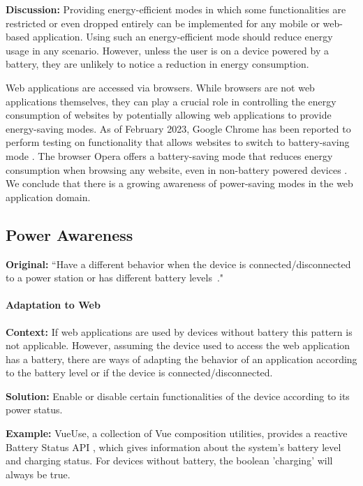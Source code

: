 \textbf{Discussion:} Providing energy-efficient modes in which some functionalities are restricted or even dropped entirely can be implemented for any mobile or web-based application. Using such an energy-efficient mode should reduce energy usage in any scenario. However, unless the user is on a device powered by a battery, they are unlikely to notice a reduction in energy consumption. 

Web applications are accessed via browsers. While browsers are not web applications themselves, they can play a crucial role in controlling the energy consumption of websites by potentially allowing web applications to provide energy-saving modes. As of February 2023, Google Chrome has been reported to perform testing on functionality that allows websites to switch to battery-saving mode \cite{chrome_battery_saving_mode} \cite{github_battery_saving_demo}. The browser Opera offers a battery-saving mode that reduces energy consumption when browsing any website, even in non-battery powered devices \cite{opera-battery-saver}. We conclude that there is a growing awareness of power-saving modes in the web application domain.

\subsection{Power Awareness} \label{sec:patterns-PowerAwareness}
\textbf{Original:} ``Have a different behavior when the device is connected/disconnected to a power station or has different battery levels~\cite{cruz2019catalog}."

\paragraph{Adaptation to Web}\mbox{}

\textbf{Context:} If web applications are used by devices without battery this pattern is not applicable. However, assuming the device used to access the web application has a battery, there are ways of adapting the behavior of an application according to the battery level or if the device is connected/disconnected.

\textbf{Solution:} Enable or disable certain functionalities of the device according to its power status.

\textbf{Example:} VueUse, a collection of Vue composition utilities, provides a reactive Battery Status API \cite{vueuse-useBattery}, which gives information about the system's battery level and charging status. For devices without battery, the boolean 'charging' will always be true.

